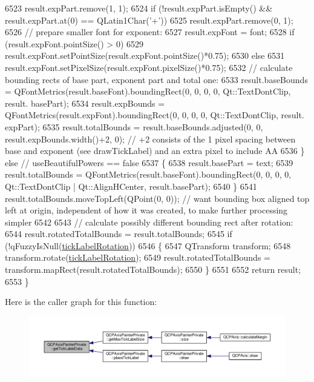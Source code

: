 \begin{DoxyCode}
6523       result.expPart.remove(1, 1);
6524     \textcolor{keywordflow}{if} (!result.expPart.isEmpty() && result.expPart.at(0) == QLatin1Char(\textcolor{charliteral}{'+'}))
6525       result.expPart.remove(0, 1);
6526     \textcolor{comment}{// prepare smaller font for exponent:}
6527     result.expFont = font;
6528     \textcolor{keywordflow}{if} (result.expFont.pointSize() > 0)
6529       result.expFont.setPointSize(result.expFont.pointSize()*0.75);
6530     \textcolor{keywordflow}{else}
6531       result.expFont.setPixelSize(result.expFont.pixelSize()*0.75);
6532     \textcolor{comment}{// calculate bounding rects of base part, exponent part and total one:}
6533     result.baseBounds = QFontMetrics(result.baseFont).boundingRect(0, 0, 0, 0, Qt::TextDontClip, result.
      basePart);
6534     result.expBounds = QFontMetrics(result.expFont).boundingRect(0, 0, 0, 0, Qt::TextDontClip, result.
      expPart);
6535     result.totalBounds = result.baseBounds.adjusted(0, 0, result.expBounds.width()+2, 0); \textcolor{comment}{// +2 consists of
       the 1 pixel spacing between base and exponent (see drawTickLabel) and an extra pixel to include AA}
6536   \} \textcolor{keywordflow}{else} \textcolor{comment}{// useBeautifulPowers == false}
6537   \{
6538     result.basePart = text;
6539     result.totalBounds = QFontMetrics(result.baseFont).boundingRect(0, 0, 0, 0, Qt::TextDontClip | 
      Qt::AlignHCenter, result.basePart);
6540   \}
6541   result.totalBounds.moveTopLeft(QPoint(0, 0)); \textcolor{comment}{// want bounding box aligned top left at origin,
       independent of how it was created, to make further processing simpler}
6542   
6543   \textcolor{comment}{// calculate possibly different bounding rect after rotation:}
6544   result.rotatedTotalBounds = result.totalBounds;
6545   \textcolor{keywordflow}{if} (!qFuzzyIsNull(\hyperlink{class_q_c_p_axis_painter_private_ae6ade9232a8e400924009e8edca94bac}{tickLabelRotation}))
6546   \{
6547     QTransform transform;
6548     transform.rotate(\hyperlink{class_q_c_p_axis_painter_private_ae6ade9232a8e400924009e8edca94bac}{tickLabelRotation});
6549     result.rotatedTotalBounds = transform.mapRect(result.rotatedTotalBounds);
6550   \}
6551   
6552   \textcolor{keywordflow}{return} result;
6553 \}
\end{DoxyCode}


Here is the caller graph for this function\+:\nopagebreak
\begin{figure}[H]
\begin{center}
\leavevmode
\includegraphics[width=350pt]{class_q_c_p_axis_painter_private_ad9f24fbcbf9d8c92b34d9d00b010e6a3_icgraph}
\end{center}
\end{figure}


